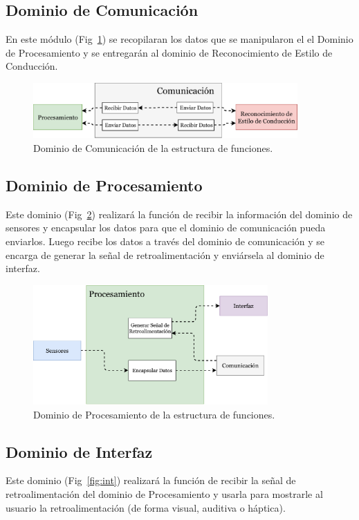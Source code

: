 \subsection{Dominio de Comunicación}
En este módulo (Fig~\ref{fig:3.6}) se recopilaran los datos que se manipularon el el Dominio de Procesamiento y se entregarán al dominio de Reconocimiento de Estilo de Conducción.

\begin{figure}[htbp!]
\centering
\includegraphics[width=0.9\textwidth]{com.pdf}
\caption{Dominio de Comunicación de la estructura de funciones.}
\label{fig:3.6}
\end{figure}

\subsection{Dominio de Procesamiento}
Este dominio (Fig~\ref{fig:proces}) realizará la función de recibir la información del dominio de sensores y encapsular los datos para que el dominio de comunicación pueda enviarlos. Luego recibe los datos a través del dominio de comunicación y se encarga de generar la señal de retroalimentación y enviársela al dominio de interfaz.

\begin{figure}[htbp!]
\centering
\includegraphics[width=0.8\textwidth]{proc.pdf}
\caption{Dominio de Procesamiento de la estructura de funciones.}
\label{fig:proces}
\end{figure}

\subsection{Dominio de Interfaz}
Este dominio (Fig~\ref{fig:int}) realizará la función de recibir la señal de retroalimentación del dominio de Procesamiento y usarla para mostrarle al usuario la retroalimentación (de forma visual, auditiva o háptica).

